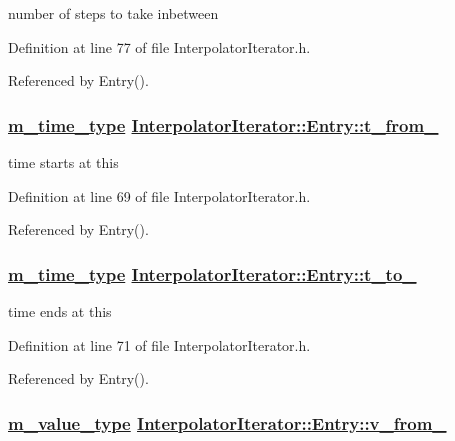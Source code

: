 number of steps to take inbetween 



Definition at line 77 of file Interpolator\-Iterator.h.

Referenced by Entry().\hypertarget{classInterpolatorIterator_1_1Entry_o0}{
\subsubsection[t\_\-from\_\-]{\setlength{\rightskip}{0pt plus 5cm}\hyperlink{Types_8h_a2}{m\_\-time\_\-type} \hyperlink{classInterpolatorIterator_1_1Entry_o0}{Interpolator\-Iterator::Entry::t\_\-from\_\-}}}
\label{classInterpolatorIterator_1_1Entry_o0}


time starts at this 



Definition at line 69 of file Interpolator\-Iterator.h.

Referenced by Entry().\hypertarget{classInterpolatorIterator_1_1Entry_o1}{
\subsubsection[t\_\-to\_\-]{\setlength{\rightskip}{0pt plus 5cm}\hyperlink{Types_8h_a2}{m\_\-time\_\-type} \hyperlink{classInterpolatorIterator_1_1Entry_o1}{Interpolator\-Iterator::Entry::t\_\-to\_\-}}}
\label{classInterpolatorIterator_1_1Entry_o1}


time ends at this 



Definition at line 71 of file Interpolator\-Iterator.h.

Referenced by Entry().\hypertarget{classInterpolatorIterator_1_1Entry_o2}{
\subsubsection[v\_\-from\_\-]{\setlength{\rightskip}{0pt plus 5cm}\hyperlink{Types_8h_a3}{m\_\-value\_\-type} \hyperlink{classInterpolatorIterator_1_1Entry_o2}{Interpolator\-Iterator::Entry::v\_\-from\_\-}}}
\label{classInterpolatorIterator_1_1Entry_o2}


